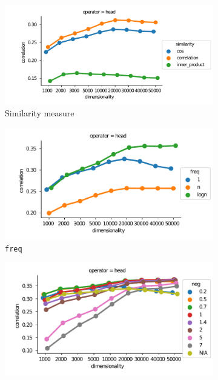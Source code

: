 \begin{figure}
  \centering

  \begin{subfigure}[t]{0.49\textwidth}
    \hspace{-20pt}
  \includegraphics[width=1.1\textwidth]{supplement/figures/SimLex999-interaction-similarity}

  \caption{Similarity measure}
  \label{fig:SimLex999-similarity}

  \end{subfigure}
  \begin{subfigure}[t]{0.49\textwidth}

  \includegraphics[width=\textwidth]{supplement/figures/SimLex999-interaction-freq}

  \caption{\texttt{freq}}
  \label{fig:SimLex999-freq}

  \end{subfigure}


  \begin{subfigure}[t]{0.49\textwidth}
  \includegraphics[width=\textwidth]{supplement/figures/SimLex999-interaction-neg}


\end{subfigure}
\end{figure}
